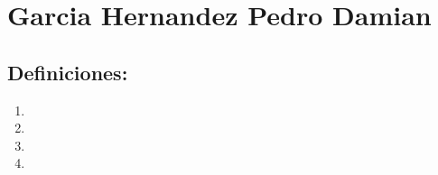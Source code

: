 \section{Garcia Hernandez Pedro Damian}
\subsection{Definiciones:}

\begin{enumerate}
    \item 
    \item 
    \item 
    \item 
\end{enumerate}